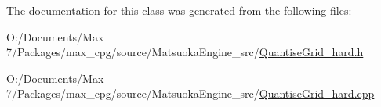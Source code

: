 The documentation for this class was generated from the following files\+:\begin{DoxyCompactItemize}
\item 
O\+:/\+Documents/\+Max 7/\+Packages/max\+\_\+cpg/source/\+Matsuoka\+Engine\+\_\+src/\mbox{\hyperlink{QuantiseGrid__hard_8h}{Quantise\+Grid\+\_\+hard.\+h}}\item 
O\+:/\+Documents/\+Max 7/\+Packages/max\+\_\+cpg/source/\+Matsuoka\+Engine\+\_\+src/\mbox{\hyperlink{QuantiseGrid__hard_8cpp}{Quantise\+Grid\+\_\+hard.\+cpp}}\end{DoxyCompactItemize}
